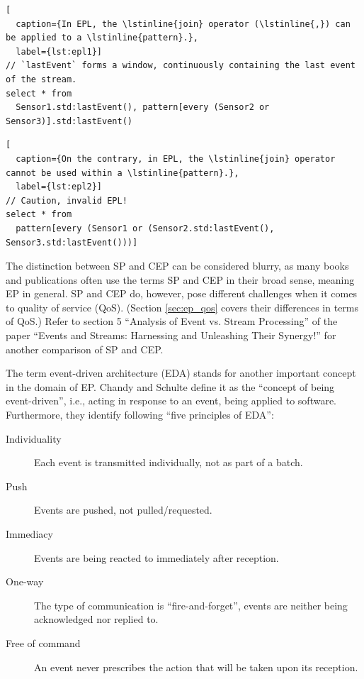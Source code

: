 \documentclass[article, 10pt, type=bsc, colorback, accentcolor=tud8b, parskip=half, bibliography=totocnumbered]{tudthesis}
\begin{document}
\begin{lstlisting}[
  caption={In EPL, the \lstinline{join} operator (\lstinline{,}) can be applied to a \lstinline{pattern}.},
  label={lst:epl1}]
// `lastEvent` forms a window, continuously containing the last event of the stream.
select * from
  Sensor1.std:lastEvent(), pattern[every (Sensor2 or Sensor3)].std:lastEvent()
\end{lstlisting}

\begin{lstlisting}[
  caption={On the contrary, in EPL, the \lstinline{join} operator cannot be used within a \lstinline{pattern}.},
  label={lst:epl2}]
// Caution, invalid EPL!
select * from
  pattern[every (Sensor1 or (Sensor2.std:lastEvent(), Sensor3.std:lastEvent()))]
\end{lstlisting}

The distinction between SP and CEP can be considered blurry, as many books and publications often use the terms SP and CEP in their broad sense, meaning EP in general.
SP and CEP do, however, pose different challenges when it comes to quality of service (QoS).
(Section \ref{sec:ep_qos} covers their differences in terms of QoS.)
Refer to section 5 ``Analysis of Event vs. Stream Processing'' of the paper ``Events and Streams: Harnessing and Unleashing Their Synergy!'' \cite{Chakravarthy:2008:ESH:1385989.1385991} for another comparison of SP and CEP.

The term event-driven architecture (EDA) stands for another important concept in the domain of EP.
Chandy and Schulte \cite{Chandy:2009:EPD:1594754} define it as the ``concept of being event-driven'', i.e., acting in response to an event, being applied to software.
Furthermore, they identify following ``five principles of EDA'':

\begin{description}
\item[Individuality]
Each event is transmitted individually, not as part of a batch.
\item[Push]
Events are pushed, not pulled/requested.
\item[Immediacy]
Events are being reacted to immediately after reception.
\item[One-way]
The type of communication is ``fire-and-forget'', events are neither being acknowledged nor replied to.
\item[Free of command]
An event never prescribes the action that will be taken upon its reception.
\end{description}
\end{document}
